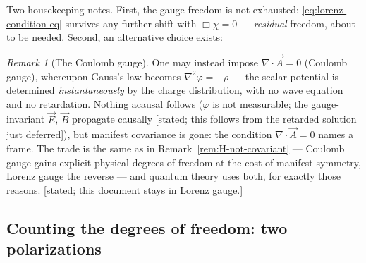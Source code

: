 \documentclass[11pt]{article}
\theoremstyle{plain}
\theoremstyle{definition}
\theoremstyle{remark}
\newtheorem{remark}[theorem]{Remark}
\newcommand{\vE}{\vec{E}}
\newcommand{\vB}{\vec{B}}
\begin{document}
Two housekeeping notes. First, the gauge freedom is not exhausted:
\eqref{eq:lorenz-condition-eq} survives any further shift with
$\Box\chi = 0$ --- \emph{residual} freedom, about to be needed.
Second, an alternative choice exists:

\begin{remark}[The Coulomb gauge]\label{rem:coulomb}
One may instead impose $\nabla\cdot\vec A = 0$ (Coulomb gauge),
whereupon Gauss's law becomes $\nabla^2\varphi = -\rho$ --- the
scalar potential is determined \emph{instantaneously} by the charge
distribution, with no wave equation and no retardation. Nothing
acausal follows ($\varphi$ is not measurable; the gauge-invariant
$\vE$, $\vB$ propagate causally [stated; this follows from the
retarded solution just deferred]), but manifest covariance is gone:
the condition $\nabla\cdot\vec A = 0$ names a frame. The trade is
the same as in Remark~\ref{rem:H-not-covariant} --- Coulomb
gauge gains explicit physical degrees of freedom at the cost of
manifest symmetry, Lorenz gauge the reverse --- and quantum theory
uses both, for exactly those reasons. [stated; this document stays in
Lorenz gauge.]
\end{remark}

\subsection{Counting the degrees of freedom: two polarizations}
\label{sec:polarizations}
\end{document}

